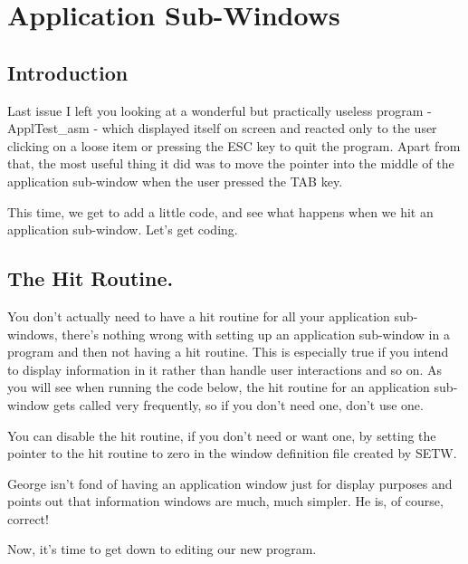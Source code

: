 \chapter{Application Sub-{}Windows}

\section{Introduction}
\label{ch28-intro}%

Last issue I left you looking at a wonderful but practically useless program - ApplTest\_asm - which displayed itself on screen and reacted only to the user clicking on a loose
        item or pressing the ESC key to quit the program. Apart from that, the most useful
        thing it did was to move the pointer into the middle of the application sub-{}window
        when the user pressed the TAB key.

This time, we get to add a little code, and see what happens when we hit an
        application sub-{}window. Let's get coding.

\section{The Hit Routine.}
\label{ch28-appl-hit}%

You don't actually need to have a hit routine for all your application
        sub-{}windows, there's nothing wrong with setting up an application sub-{}window in a
        program and then not having a hit routine. This is especially true if you intend
        to display information in it rather than handle user interactions and so on. As
        you will see when running the code below, the hit routine for an application
        sub-{}window gets called very frequently, so if you don't need one, don't use
        one.

You can disable the hit routine, if you don't need or want one, by setting
        the pointer to the hit routine to zero in the window definition file created by SETW. 
        
\begin{note}
George isn't fond of having an application window just for display purposes and points out that information windows are much, much simpler. He is, of course, correct!
\end{note}        
 
 Now, it's time to get down to editing our new
        program.


